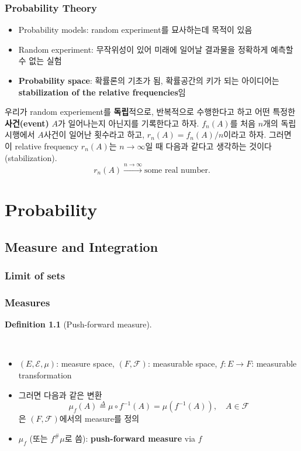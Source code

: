 \documentclass[
  13pt,
  letterpaper,
  DIV=11,
  numbers=noendperiod]{scrreprt}
\theoremstyle{definition}
\newtheorem{definition}{Definition}[chapter]
\theoremstyle{plain}
\theoremstyle{definition}
\theoremstyle{plain}
\theoremstyle{plain}
\theoremstyle{definition}
\theoremstyle{remark}
\begin{document}
\section{Probability Theory}\label{probability-theory}

\begin{itemize}
\item
  Probability models: random experiment를 묘사하는데 목적이 있음
\item
  Random experiment: 무작위성이 있어 미래에 일어날 결과물을 정확하게
  예측할 수 없는 실험
\item
  \textbf{Probability space}: 확률론의 기초가 됨, 확률공간의 키가 되는
  아이디어는 \textbf{stabilization of the relative frequencies}임
\end{itemize}

우리가 random experiement를 \textbf{독립}적으로, 반복적으로 수행한다고
하고 어떤 특정한 \textbf{사건(event)} \(A\)가 일어나는지 아닌지를
기록한다고 하자. \(f_n (A)\)를 처음 \(n\)개의 독립시행에서 \(A\)사건이
일어난 횟수라고 하고, \(r_n (A) = f_n (A)/n\)이라고 하자. 그러면 이
relative frequency \(r_n (A)\)는 \(n\rightarrow \infty\)일 때 다음과
같다고 생각하는 것이다(stabilization). \[
r_n(A) \stackrel{n\rightarrow \infty}{\longrightarrow} \text{some real number.}
\]

\part{Probability}

\chapter{Measure and Integration}\label{sec-measure}

\section{Limit of sets}\label{limit-of-sets}

\section{Measures}\label{measures}

\begin{definition}[Push-forward
measure]\protect\hypertarget{def-pushforwardm}{}\label{def-pushforwardm}

~

\begin{itemize}
\item
  \((E,\mathcal{E},\mu)\): measure space, \((F, \mathcal{F})\):
  measurable space, \(f: E\rightarrow F\): measurable transformation
\item
  그러면 다음과 같은 변환 \[
  \mu_f (A) \stackrel{\Delta}{=}\mu \circ f^{-1}(A) = \mu (f^{-1}(A)), \quad{} A\in \mathcal{F}
  \] 은 \((F, \mathcal{F})\)에서의 measure를 정의
\item
  \(\mu_f\) (또는 \(f^\#\mu\)로 씀): \textbf{push-forward measure} via
  \(f\)
\end{itemize}

\end{definition}
\end{document}
